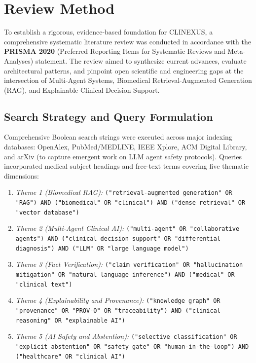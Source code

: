 \documentclass[12pt,a4paper]{report}
\begin{document}
\section{Review Method}
To establish a rigorous, evidence-based foundation for CLINEXUS, a comprehensive systematic literature review was conducted in accordance with the \textbf{PRISMA 2020} (Preferred Reporting Items for Systematic Reviews and Meta-Analyses) statement. The review aimed to synthesize current advances, evaluate architectural patterns, and pinpoint open scientific and engineering gaps at the intersection of Multi-Agent Systems, Biomedical Retrieval-Augmented Generation (RAG), and Explainable Clinical Decision Support.

\subsection{Search Strategy and Query Formulation}
Comprehensive Boolean search strings were executed across major indexing databases: OpenAlex, PubMed/MEDLINE, IEEE Xplore, ACM Digital Library, and arXiv (to capture emergent work on LLM agent safety protocols). Queries incorporated medical subject headings and free-text terms covering five thematic dimensions:
\begin{enumerate}
    \item \textit{Theme 1 (Biomedical RAG):} \texttt{("retrieval-augmented generation" OR "RAG") AND ("biomedical" OR "clinical") AND ("dense retrieval" OR "vector database")}
    \item \textit{Theme 2 (Multi-Agent Clinical AI):} \texttt{("multi-agent" OR "collaborative agents") AND ("clinical decision support" OR "differential diagnosis") AND ("LLM" OR "large language model")}
    \item \textit{Theme 3 (Fact Verification):} \texttt{("claim verification" OR "hallucination mitigation" OR "natural language inference") AND ("medical" OR "clinical text")}
    \item \textit{Theme 4 (Explainability and Provenance):} \texttt{("knowledge graph" OR "provenance" OR "PROV-O" OR "traceability") AND ("clinical reasoning" OR "explainable AI")}
    \item \textit{Theme 5 (AI Safety and Abstention):} \texttt{("selective classification" OR "explicit abstention" OR "safety gate" OR "human-in-the-loop") AND ("healthcare" OR "clinical AI")}
\end{enumerate}
\end{document}
